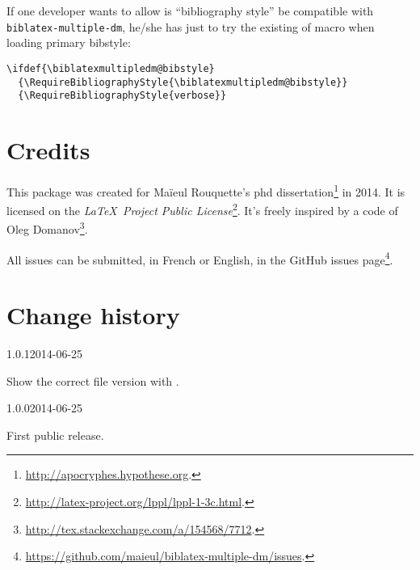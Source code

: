 \documentclass{ltxdockit}[2011/03/25]
\begin{document}
If one developer wants to allow is \enquote{bibliography style} be compatible with \verb+biblatex-multiple-dm+, he/she has just to try the existing of  macro  when loading primary bibstyle:

\begin{verbatim}
\ifdef{\biblatexmultipledm@bibstyle}
  {\RequireBibliographyStyle{\biblatexmultipledm@bibstyle}}
  {\RequireBibliographyStyle{verbose}}
\end{verbatim} 

\section{Credits}

This package was created for Maïeul Rouquette's phd dissertation\footnote{\url{http://apocryphes.hypothese.org}.} in 2014. It is licensed on the \emph{\LaTeX\ Project Public License}\footnote{\url{http://latex-project.org/lppl/lppl-1-3c.html}.}. It's freely inspired by a code of Oleg Domanov\footnote{\url{http://tex.stackexchange.com/a/154568/7712}.}.


All issues can be submitted, in French or English, in the GitHub issues page\footnote{\url{https://github.com/maieul/biblatex-multiple-dm/issues}.}.

\section{Change history}

\begin{changelog}

\begin{release}{1.0.1}{2014-06-25}
\item Show the correct file version with .
\end{release}


\begin{release}{1.0.0}{2014-06-25}
\item First public release.
\end{release}
\end{changelog}
\end{document}
